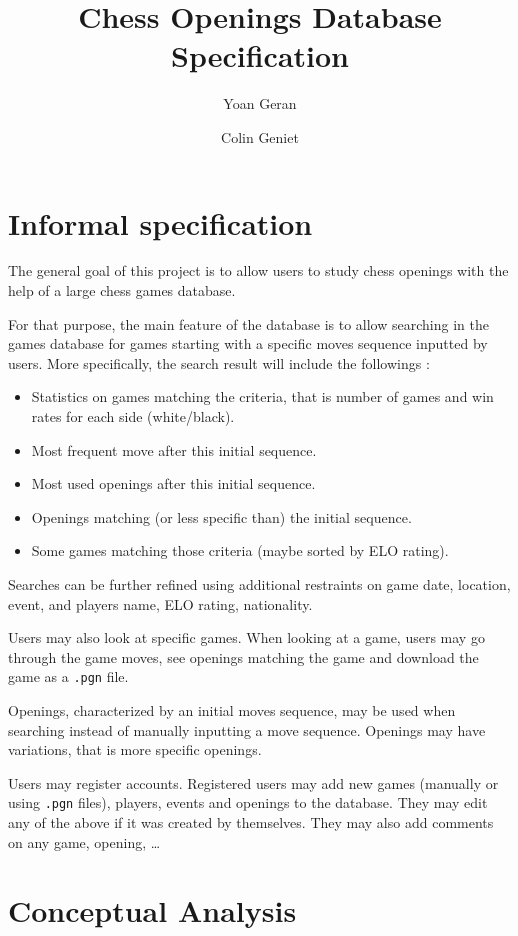 \documentclass{article}
\begin{document}
\title{Chess Openings Database Specification}
\author{Yoan Geran \and Colin Geniet}
\maketitle

\tableofcontents

\section{Informal specification}
The general goal of this project is to allow users to study chess openings
with the help of a large chess games database.

For that purpose, the main feature of the database is to allow searching
in the games database for games starting with a specific moves sequence
inputted by users.
More specifically, the search result will include the followings :
\begin{itemize}
\item Statistics on games matching the criteria, that is number of games and
win rates for each side (white/black).
\item Most frequent move after this initial sequence.
\item Most used openings after this initial sequence.
\item Openings matching (or less specific than) the initial sequence.
\item Some games matching those criteria (maybe sorted by ELO rating).
\end{itemize}

Searches can be further refined using additional restraints on game date, location,
event, and players name, ELO rating, nationality.

Users may also look at specific games.
When looking at a game, users may go through the game moves,
see openings matching the game and download the game as a \verb|.pgn| file.

Openings, characterized by an initial moves sequence, may be used when searching
instead of manually inputting a move sequence.
Openings may have variations, that is more specific openings.

Users may register accounts. Registered users may add new games (manually or using \verb|.pgn| files),
players, events and openings to the database. They may edit any of the above if it was
created by themselves. They may also add comments on any game, opening, \dots


\section{Conceptual Analysis}
\end{document}
